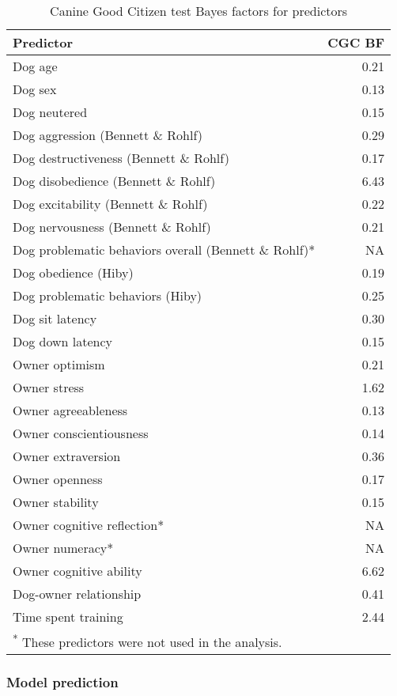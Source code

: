 \documentclass[
  english,
  ,pub,floatsintext]{apa6}
\begin{document}
\begin{table}

\caption{\label{tab:cgc-table}Canine Good Citizen test Bayes factors for predictors}
\centering
\fontsize{9}{11}\selectfont
\begin{tabular}[t]{lr}
\toprule
Predictor & CGC BF\\
\midrule
Dog age & 0.21\\
Dog sex & 0.13\\
Dog neutered & 0.15\\
Dog aggression (Bennett \& Rohlf) & 0.29\\
Dog destructiveness (Bennett \& Rohlf) & 0.17\\
Dog disobedience (Bennett \& Rohlf) & 6.43\\
Dog excitability (Bennett \& Rohlf) & 0.22\\
Dog nervousness (Bennett \& Rohlf) & 0.21\\
Dog problematic behaviors overall (Bennett \& Rohlf)* & NA\\
Dog obedience (Hiby) & 0.19\\
Dog problematic behaviors (Hiby) & 0.25\\
Dog sit latency & 0.30\\
Dog down latency & 0.15\\
Owner optimism & 0.21\\
Owner stress & 1.62\\
Owner agreeableness & 0.13\\
Owner conscientiousness & 0.14\\
Owner extraversion & 0.36\\
Owner openness & 0.17\\
Owner stability & 0.15\\
Owner cognitive reflection* & NA\\
Owner numeracy* & NA\\
Owner cognitive ability & 6.62\\
Dog-owner relationship & 0.41\\
Time spent training & 2.44\\
\bottomrule
\multicolumn{2}{l}{\textsuperscript{*} These predictors were not used in the analysis.}\\
\end{tabular}
\end{table}

\hypertarget{model-prediction}{%
\subsubsection{Model prediction}\label{model-prediction}}
\end{document}
